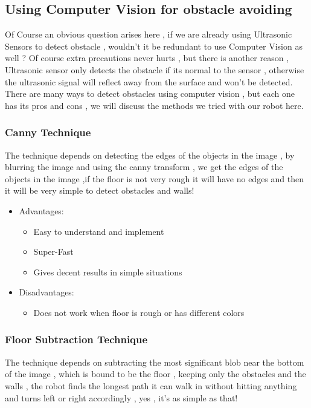 \documentclass[12pt]{article}
\begin{document}
\newpage

\subsection{Using Computer Vision for obstacle avoiding}
Of Course an obvious question arises here , if we are already using Ultrasonic Sensors to detect obstacle , wouldn’t it be redundant to use Computer Vision as well ? Of course extra precautions never hurts , but there is another reason , Ultrasonic sensor only detects the obstacle if its normal to the sensor , otherwise the ultrasonic signal will reflect away from the surface and won’t be detected.\\

\noindent There are many ways to detect obstacles using computer vision , but each one has its pros and cons , we will discuss the methods we tried with our robot here.

\subsubsection{Canny Technique}
The technique depends on detecting the edges of the objects in the image , by blurring the image and using the canny transform , we get the edges of the objects in the image ,if the floor is not very rough it will have no edges and then it will be very simple to detect obstacles and walls!\\

\begin{itemize}
	\item Advantages:
	\begin{itemize}
		\item Easy to understand and implement 
		\item Super-Fast
		\item Gives decent results in simple situations
	\end{itemize}
	\item Disadvantages:
	\begin{itemize}
		\item Does not work when floor is rough or has different colors 
	\end{itemize}
\end{itemize}

\subsubsection{Floor Subtraction Technique}
The technique depends on subtracting the most significant blob near the bottom of the image , which is bound to be the floor , keeping only the obstacles and the walls , the robot finds the longest path it can walk in without hitting anything and turns left or right accordingly , yes , it’s as simple as that!
\end{document}
